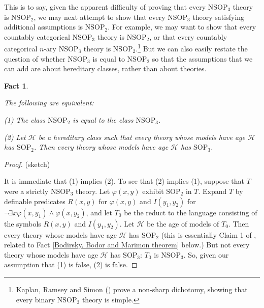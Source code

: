 \documentclass{amsart}
\newtheorem{fact}[theorem]{Fact}
\theoremstyle{definition}
\theoremstyle{remark}
\numberwithin{equation}{section}
\begin{document}
This is to say, given the apparent difficulty of proving that every $\mathrm{NSOP}_{3}$ theory is $\mathrm{NSOP}_{2}$, we may next attempt to show that every $\mathrm{NSOP}_{3}$ theory satisfying additional assumptions is $\mathrm{NSOP}_{2}$. For example, we may want to show that every countably categorical $\mathrm{NSOP}_{3}$ theory is $\mathrm{NSOP}_{2}$, or that every countably categorical $n$-ary $\mathrm{NSOP}_{3}$ theory is $\mathrm{NSOP}_{2}$.\footnote{Kaplan, Ramsey and Simon (\cite{KRS23}) prove a non-sharp dichotomy, showing that every binary $\mathrm{NSOP}_{3}$ theory is simple.} But we can also easily restate the question of whether $\mathrm{NSOP}_{3}$ is equal to $\mathrm{NSOP}_{2}$ so that the assumptions that we can add are about hereditary classes, rather than about theories.

\begin{fact}\label{hereditary class restatement of sop2-sop3 problem}

The following are equivalent:

(1) The class $\mathrm{NSOP}_{2}$ is equal to the class $\mathrm{NSOP}_{3}$.

(2) Let $\mathcal{H}$ be a hereditary class such that every theory whose models have age $\mathcal{H}$ has $\mathrm{SOP}_{2}$. Then every theory whose models have age $\mathcal{H}$ has $\mathrm{SOP}_{3}$.


    
\end{fact}

\begin{proof}(sketch)

It is immediate that (1) implies (2). To see that (2) implies (1), suppose that $T$ were a strictly $\mathrm{NSOP}_{3}$ theory. Let $\varphi(x, y)$ exhibit $\mathrm{SOP}_{2}$ in $T$. Expand $T$ by definable predicates $R(x, y)$ for $\varphi(x, y)$ and $I(y_{1}, y_{2})$ for $\neg \exists x \varphi(x, y_{1}) \wedge \varphi(x, y_{2}) $, and let $T_{0}$ be the reduct to the language consisting of the symbols $R(x, y)$ and $I(y_{1}, y_{2})$. Let $\mathcal{H}$ be the age of models of $T_{0}$. Then every theory whose models have age $\mathcal{H}$ has $\mathrm{SOP}_{2}$ (this is essentially Claim 1 of \cite{Patterning}, related to Fact \ref{Bodirsky, Bodor and Marimon theorem} below.) But not every theory whose models have age $\mathcal{H}$ has $\mathrm{SOP}_{3}$: $T_{0}$ is $\mathrm{NSOP}_{3}$. So, given our assumption that (1) is false, (2) is false.

    
\end{proof}
\end{document}
